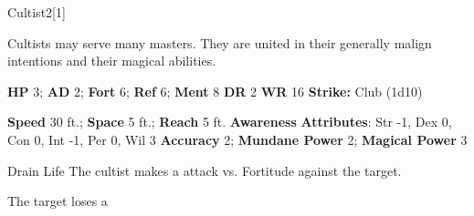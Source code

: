   \begin{monsection}{Cultist}{2}[1]
    \vspace{-1em}\vspace{-1em}
    \vspace{0em}

    
      Cultists may serve many masters.
      They are united in their generally malign intentions and their magical abilities.
    

    \begin{spellcontent}
      \begin{spelltargetinginfo}
        \pari \textbf{HP} 3;
          \textbf{AD} 2;
          \textbf{Fort} 6;
          \textbf{Ref} 6;
          \textbf{Ment} 8
        \pari \textbf{DR} 2
        \pari \textbf{WR} 16
        \pari \textbf{Strike:}
            Club  (1d10)
      \end{spelltargetinginfo}
    \end{spellcontent}
    \begin{monsterfooter}
      \pari \textbf{Speed} 30 ft.;
        \textbf{Space} 5 ft.;
        \textbf{Reach} 5 ft.
      \pari \textbf{Awareness} 
      \pari \textbf{Attributes}:
        Str -1, Dex 0,
        Con 0, Int -1,
        Per 0, Wil 3
      \pari \textbf{Accuracy} 2;
        \textbf{Mundane Power} 2;
      \textbf{Magical Power} 3
    \end{monsterfooter}
  \end{monsection}
  \begin{freeability}{Drain Life}
       The cultist makes a  attack
        vs. Fortitude against the target.
    
    \hit The target loses a 
    \end{freeability}
  
